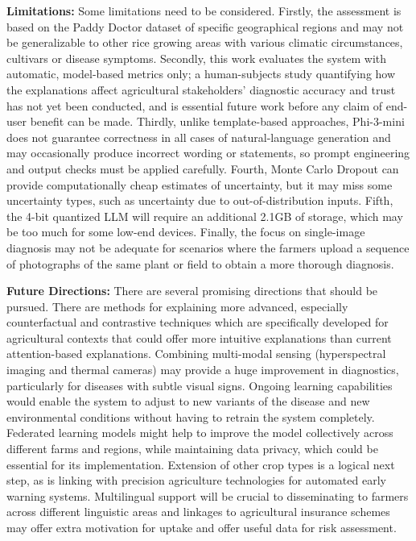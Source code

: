 \documentclass[pdflatex,sn-mathphys-num]{sn-jnl}%
\begin{document}
\textbf{Limitations:} Some limitations need to be considered. Firstly, the assessment is based on the Paddy Doctor dataset of specific geographical regions and may not be generalizable to other rice growing areas with various climatic circumstances, cultivars or disease symptoms. Secondly, this work evaluates the system with automatic, model-based metrics only; a human-subjects study quantifying how the explanations affect agricultural stakeholders' diagnostic accuracy and trust has not yet been conducted, and is essential future work before any claim of end-user benefit can be made. Thirdly, unlike template-based approaches, Phi-3-mini does not guarantee correctness in all cases of natural-language generation and may occasionally produce incorrect wording or statements, so prompt engineering and output checks must be applied carefully. Fourth, Monte Carlo Dropout can provide computationally cheap estimates of uncertainty, but it may miss some uncertainty types, such as uncertainty due to out-of-distribution inputs. Fifth, the 4-bit quantized LLM will require an additional 2.1GB of storage, which may be too much for some low-end devices. Finally, the focus on single-image diagnosis may not be adequate for scenarios where the farmers upload a sequence of photographs of the same plant or field to obtain a more thorough diagnosis.

\textbf{Future Directions:} There are several promising directions that should be pursued. There are methods for explaining more advanced, especially counterfactual and contrastive techniques which are specifically developed for agricultural contexts that could offer more intuitive explanations than current attention-based explanations. Combining multi-modal sensing (hyperspectral imaging and thermal cameras) may provide a huge improvement in diagnostics, particularly for diseases with subtle visual signs. Ongoing learning capabilities would enable the system to adjust to new variants of the disease and new environmental conditions without having to retrain the system completely. Federated learning models might help to improve the model collectively across different farms and regions, while maintaining data privacy, which could be essential for its implementation. Extension of other crop types is a logical next step, as is linking with precision agriculture technologies for automated early warning systems. Multilingual support will be crucial to disseminating to farmers across different linguistic areas and linkages to agricultural insurance schemes may offer extra motivation for uptake and offer useful data for risk assessment.
\end{document}
